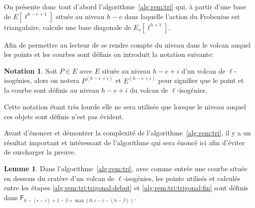 \documentclass[10pt,a4paper]{book}
\theoremstyle{plain}
\theoremstyle{definition}
\newtheorem{lem}[thm]{Lemme}
\theoremstyle{definition}
\theoremstyle{definition}
\theoremstyle{definition}
\theoremstyle{remark}
\theoremstyle{remark}
\theoremstyle{definition}
\newtheorem{nota}[thm]{Notation}
\begin{document}
On présente donc tout d'abord l'algorithme~\ref{alg:rem:tri} 
qui, à partir d'une base de $E[\ell^{h-e+1}]$ située au niveau $h-e$ dans 
laquelle l'action du Frobenius est triangulaire, calcule une base diagonale de 
$E_s[\ell^{h+1}]$.

Afin de permettre au lecteur de se rendre compte du niveau dans le volcan 
auquel les points et les courbes sont définis on introduit la notation suivante:
\begin{nota}
Soit $P \in E$ avec $E$ située au niveau $h-e+i$ d'un volcan de 
$\ell$-isogénies, alors on notera $P^{(h-e+i)}$ et $E^{(h-e+i)}$ pour signifier
que le point et la courbe sont définis au niveau $h-e+i$ du volcan de 
$\ell$-isogénies.
\end{nota}
Cette notation étant très lourde elle ne sera utilisée que lorsque le niveau 
auquel ces objets sont définis n'est pas évident.

Avant d'énoncer et démontrer la complexité de l'algorithme~\ref{alg:rem:tri}, 
il y a un résultat important et intéressant de l'algorithme qui sera énoncé ici
afin d'éviter de surcharger la preuve.

\begin{lem}
\label{lem:alg:rat}
Dans l'algorithme~\ref{alg:rem:tri}, avec comme entrée une courbe située en 
dessous du cratère d'un volcan de $\ell$-isogénies, les points utilisés et 
calculés entre les étapes \ref{alg:rem:tri:trigonal:debut} et 
\ref{alg:rem:tri:trigonal:fin} sont définis dans $\mathsf{F}_{h-(e-i)+1-\beta+
\max(0,e-i-(h-\beta))}$.
\end{lem}
\end{document}
